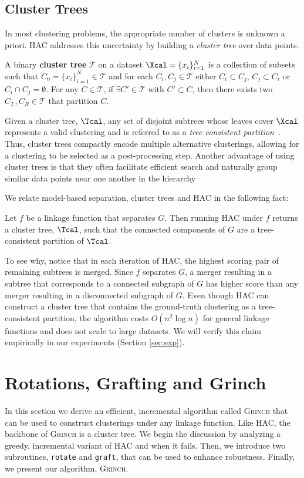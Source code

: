 \documentclass{article} \usepackage[utf8]{inputenc} \usepackage[T1]{fontenc}    \usepackage{hyperref}       \usepackage{url}            \usepackage{booktabs}       \usepackage{amsfonts}       \usepackage{nicefrac}       \usepackage{microtype}      \usepackage{geometry}
\newcommand{\alg}{\textsc{Grinch}\xspace}
\newcommand{\records}{data points\xspace}
\newcommand{\hac}{\textsc{HAC}\xspace}
\newcommand{\graft}{\texttt{graft}\xspace}
\newcommand{\rotate}{\texttt{rotate}\xspace}
\newcommand{\hof}{linkage function\xspace}
\begin{document}
\subsection{Cluster Trees}
\label{subsec:clustertrees}
In most clustering problems, the appropriate number of clusters is
unknown a priori. \hac addresses this uncertainty by building a
\emph{cluster tree} over \records.

\begin{definition}
  A binary
\textbf{cluster tree} $\mathcal{T}$ on a dataset $\Xcal=\{x_i\}_{i=1}^N$ is a
collection of subsets such that $C_0 = \{x_i\}_{i=1}^N \in \mathcal{T}$
and for each $C_i,C_j \in \mathcal{T}$ either $C_i \subset C_j$, $C_j \subset
C_i$ or $C_i \cap C_j = \emptyset$.  For any $C \in \mathcal{T}$, if $\exists C'
\in \mathcal{T}$ with $C' \subset C$, then there exists two $C_L,C_R\in
\mathcal{T}$ that partition $C$.
\end{definition}

\noindent Given a cluster tree, $\Tcal$, any set of disjoint subtrees
whose leaves cover $\Xcal$ represents a valid clustering and is
referred to as a \emph{tree consistent
  partition}~\cite{heller2005bayesian}. Thus, cluster trees compactly
encode multiple alternative clusterings, allowing for a clustering to
be selected as a post-processing step.  Another advantage of using
cluster trees is that they often facilitate efficient search and
naturally group similar \records near one another in the hierarchy

We relate model-based separation, cluster trees and \hac in the following fact:

\begin{fact}
  \label{fact:hac}
  Let $f$ be a \hof that separates $G$. Then running \hac under
  $f$ returns a cluster tree, $\Tcal$, such that the connected
  components of $G$ are a tree-consistent partition of $\Tcal$.
\end{fact}
\noindent To see why, notice that in each iteration of HAC, the highest scoring
pair of remaining subtrees is merged. Since $f$ separates $G$, a
merger resulting in a subtree that corresponds to a connected subgraph
of $G$ has higher score than any merger resulting in a disconnected
subgraph of $G$. Even though HAC can construct a cluster tree that
contains the ground-truth clustering as a tree-consistent partition,
the algorithm costs $O(n^2\log n)$ for general linkage functions and
does not scale to large datasets. We will verify this claim
empirically in our experiments (Section \ref{sec:exp}). \section{Rotations, Grafting and Grinch}
\label{sec:inference}
In this section we derive an efficient, incremental algorithm called
\alg that can be used to construct clusterings under any \hof. Like
\hac, the backbone of \alg is a cluster tree. We begin the discussion
by analyzing a greedy, incremental variant of \hac and when it
fails. Then, we introduce two subroutines, \rotate and \graft, that
can be used to enhance robustness. Finally, we present our algorithm,
\alg.
\end{document}
